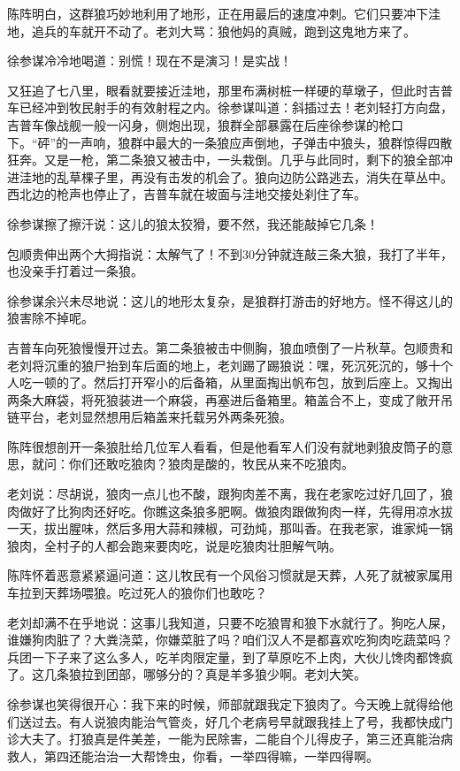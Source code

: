 \par 陈阵明白，这群狼巧妙地利用了地形，正在用最后的速度冲刺。它们只要冲下洼地，追兵的车就开不动了。老刘大骂：狼他妈的真贼，跑到这鬼地方来了。
\par 徐参谋冷冷地喝道：别慌！现在不是演习！是实战！
\par 又狂追了七八里，眼看就要接近洼地，那里布满树桩一样硬的草墩子，但此时吉普车已经冲到牧民射手的有效射程之内。徐参谋叫道：斜插过去！老刘轻打方向盘，吉普车像战舰一般一闪身，侧炮出现，狼群全部暴露在后座徐参谋的枪口下。“砰”的一声响，狼群中最大的一条狼应声倒地，子弹击中狼头，狼群惊得四散狂奔。又是一枪，第二条狼又被击中，一头栽倒。几乎与此同时，剩下的狼全部冲进洼地的乱草棵子里，再没有击发的机会了。狼向边防公路逃去，消失在草丛中。西北边的枪声也停止了，吉普车就在坡面与洼地交接处刹住了车。
\par 徐参谋擦了擦汗说：这儿的狼太狡猾，要不然，我还能敲掉它几条！
\par 包顺贵伸出两个大拇指说：太解气了！不到30分钟就连敲三条大狼，我打了半年，也没亲手打着过一条狼。
\par 徐参谋余兴未尽地说：这儿的地形太复杂，是狼群打游击的好地方。怪不得这儿的狼害除不掉呢。
\par 吉普车向死狼慢慢开过去。第二条狼被击中侧胸，狼血喷倒了一片秋草。包顺贵和老刘将沉重的狼尸抬到车后面的地上，老刘踢了踢狼说：嘿，死沉死沉的，够十个人吃一顿的了。然后打开窄小的后备箱，从里面掏出帆布包，放到后座上。又掏出两条大麻袋，将死狼装进一个麻袋，再塞进后备箱里。箱盖合不上，变成了敞开吊链平台，老刘显然想用后箱盖来托载另外两条死狼。
\par 陈阵很想剖开一条狼肚给几位军人看看，但是他看军人们没有就地剥狼皮筒子的意思，就问：你们还敢吃狼肉？狼肉是酸的，牧民从来不吃狼肉。
\par 老刘说：尽胡说，狼肉一点儿也不酸，跟狗肉差不离，我在老家吃过好几回了，狼肉做好了比狗肉还好吃。你瞧这条狼多肥啊。做狼肉跟做狗肉一样，先得用凉水拔一天，拔出腥味，然后多用大蒜和辣椒，可劲炖，那叫香。在我老家，谁家炖一锅狼肉，全村子的人都会跑来要肉吃，说是吃狼肉壮胆解气呐。
\par 陈阵怀着恶意紧紧逼问道：这儿牧民有一个风俗习惯就是天葬，人死了就被家属用车拉到天葬场喂狼。吃过死人的狼你们也敢吃？
\par 老刘却满不在乎地说：这事儿我知道，只要不吃狼胃和狼下水就行了。狗吃人屎，谁嫌狗肉脏了？大粪浇菜，你嫌菜脏了吗？咱们汉人不是都喜欢吃狗肉吃蔬菜吗？兵团一下子来了这么多人，吃羊肉限定量，到了草原吃不上肉，大伙儿馋肉都馋疯了。这几条狼拉到团部，哪够分的？真是羊多狼少啊。老刘大笑。
\par 徐参谋也笑得很开心：我下来的时候，师部就跟我定下狼肉了。今天晚上就得给他们送过去。有人说狼肉能治气管炎，好几个老病号早就跟我挂上了号，我都快成门诊大夫了。打狼真是件美差，一能为民除害，二能自个儿得皮子，第三还真能治病救人，第四还能治治一大帮馋虫，你看，一举四得嘛，一举四得啊。
